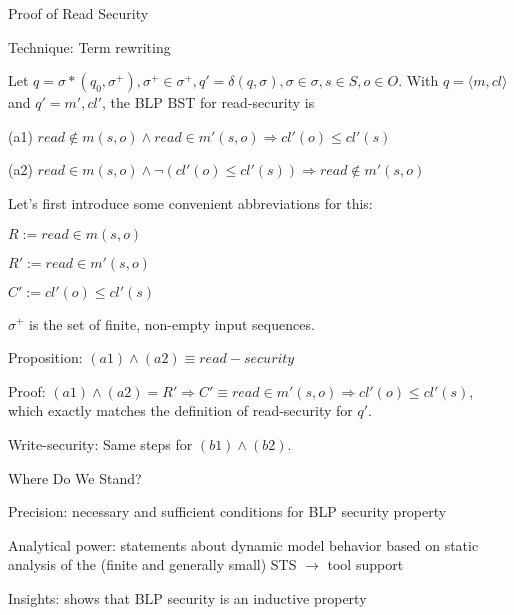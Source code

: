\documentclass[a4paper]{article}
\begin{document}
\begin{multicols}{3}
    Proof of Read Security
    \begin{itemize*}
        \item Technique: Term rewriting
        \item Let $q=\sigma*(q_0 ,\sigma^+),\sigma^+\in\sigma^+,q'=\delta(q,\sigma),\sigma\in\sigma,s\in S,o\in O$. With $q=⟨m,cl⟩$ and $q'=m',cl'$, the BLP BST for read-security is
              \begin{itemize*}
                  \item (a1) $read \not\in m(s,o) \wedge read\in m'(s,o) \Rightarrow cl'(o) \leq cl'(s)$
                  \item (a2) $read \in m(s,o) \wedge\lnot (cl'(o)\leq cl'(s)) \Rightarrow read \not\in m'(s,o)$
                  \item Let’s first introduce some convenient abbreviations for this:
                        \begin{itemize*}
                            \item $R:=read\in m(s,o)$
                            \item $R':=read\in m'(s,o)$
                            \item $C':=cl'(o) \leq cl'(s)$
                            \item $\sigma^+$ is the set of finite, non-empty input sequences.
                        \end{itemize*}
                  \item Proposition: $(a1) \wedge (a2)\equiv read-security$
                  \item Proof: $(a1) \wedge (a2)= R' \Rightarrow C'\equiv read\in m'(s,o) \Rightarrow cl'(o)\leq cl'(s)$, which exactly matches the definition of read-security for $q'$.
                  \item Write-security: Same steps for $(b1)\wedge (b2)$.
              \end{itemize*}
    \end{itemize*}

    Where Do We Stand?
    \begin{itemize*}
        \item Precision: necessary and sufficient conditions for BLP security property
        \item Analytical power: statements about dynamic model behavior based on static analysis of the (finite and generally small) STS $\rightarrow$ tool support
        \item Insights: shows that BLP security is an inductive property
    \end{itemize*}


\end{multicols}
\end{document}
